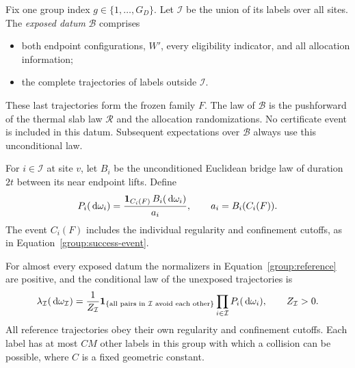 Fix one group index $g\in\{1,\ldots,G_D\}$.  Let
$\mathcal I$ be the union of its labels over all sites.
The \emph{exposed datum} $\mathcal B$ comprises
\begin{itemize}
 \item both endpoint configurations, $W'$, every eligibility indicator,
 and all allocation information;
 \item the complete trajectories of labels outside $\mathcal I$.
\end{itemize}
These last trajectories form the frozen family $F$.
The law of $\mathcal B$ is the pushforward of the thermal slab law
$\mathcal R$ and the allocation randomizations.  No certificate event is included
in this datum.  Subsequent expectations over $\mathcal B$ always use
this unconditional law.

For $i\in\mathcal I$ at site $v$, let $B_i$ be the unconditioned
Euclidean bridge law of duration $2t$ between its near endpoint lifts.
Define
\begin{equation}\label{group:reference}
 P_i(\,\mathrm d\omega_i)=
 \frac{\mathbf 1_{C_i(F)}\,B_i(\,\mathrm d\omega_i)}{a_i},
 \qquad a_i=B_i(C_i(F)).
\end{equation}
The event $C_i(F)$ includes the individual regularity and confinement
cutoffs, as in Equation~\eqref{group:success-event}.

\begin{lemma}\label{lem:conditional-law}
For almost every exposed datum the normalizers in
Equation~\eqref{group:reference} are positive, and the conditional law
of the unexposed trajectories is
\begin{equation}\label{group:product-law}
 \lambda_{\mathcal I}(\,\mathrm d\omega_{\mathcal I})
 =\frac{1}{Z_{\mathcal I}}
   \mathbf 1_{\{\text{all pairs in $\mathcal I$ avoid each other}\}}
   \prod_{i\in\mathcal I}P_i(\,\mathrm d\omega_i),
 \qquad Z_{\mathcal I}>0.
\end{equation}
All reference trajectories obey their own regularity and confinement
cutoffs.  Each label has at most $C M$ other labels in this group with
which a collision can be possible, where $C$ is a fixed geometric
constant.
\end{lemma}

